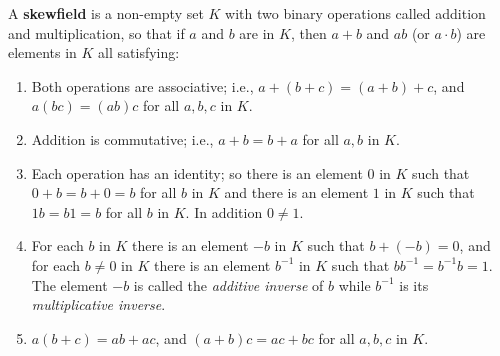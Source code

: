A \textbf{skewfield} is a non-empty set $K$ with two binary operations called addition and multiplication, so that if $a$ and $b$ are in $K$, then $a+b$ and $ab$ (or $a \cdot b$) are elements in $K$ all satisfying:

\begin{enumerate}
\item[(1)] Both operations are associative; i.e., $a+(b+c)=(a+b)+c$, and $a(bc)=(ab)c$ for all $a,b,c$ in $K$.
\item[(2)] Addition is commutative; i.e., $a+b = b+a$ for all $a,b$ in $K$.
\item[(3)] Each operation has an identity; so there is an element $0$ in $K$ such that $0+b = b+0 = b$ for all $b$ in $K$ and there is an element $1$ in $K$ such that $1b = b1 = b$ for all $b$ in $K$. In addition $0 \neq 1$.
\item[(4)] For each $b$ in $K$ there is an element $-b$ in $K$ such that $b+(-b)=0$, and for each $b \neq 0$ in $K$ there is an element $b^{-1}$ in $K$ such that $bb^{-1}=b^{-1}b=1$. The element $-b$ is called the \textit{additive inverse} of $b$ while $b^{-1}$ is its \textit{multiplicative inverse}.
\item[(5)] $a(b+c) = ab + ac$, and $(a+b)c = ac + bc$ for all $a,b,c$ in $K$.
\end{enumerate}
